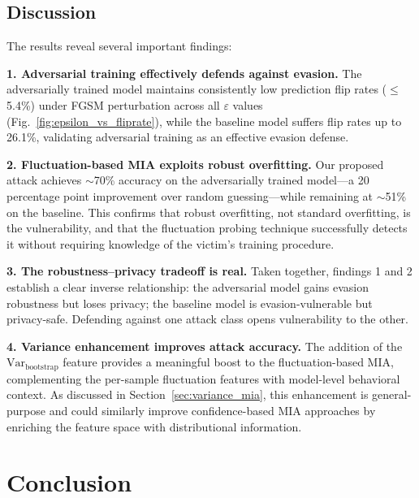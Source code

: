 \documentclass[conference]{IEEEtran}
\begin{document}
\subsection{Discussion}

The results reveal several important findings:

\textbf{1. Adversarial training effectively defends against evasion.} The adversarially trained model maintains consistently low prediction flip rates ($\leq$5.4\%) under FGSM perturbation across all $\varepsilon$ values (Fig.~\ref{fig:epsilon_vs_fliprate}), while the baseline model suffers flip rates up to 26.1\%, validating adversarial training as an effective evasion defense.

\textbf{2. Fluctuation-based MIA exploits robust overfitting.} Our proposed attack achieves $\sim$70\% accuracy on the adversarially trained model---a 20 percentage point improvement over random guessing---while remaining at $\sim$51\% on the baseline. This confirms that robust overfitting, not standard overfitting, is the vulnerability, and that the fluctuation probing technique successfully detects it without requiring knowledge of the victim's training procedure.

\textbf{3. The robustness--privacy tradeoff is real.} Taken together, findings 1 and 2 establish a clear inverse relationship: the adversarial model gains evasion robustness but loses privacy; the baseline model is evasion-vulnerable but privacy-safe. Defending against one attack class opens vulnerability to the other.

\textbf{4. Variance enhancement improves attack accuracy.} The addition of the $\text{Var}_{\text{bootstrap}}$ feature provides a meaningful boost to the fluctuation-based MIA, complementing the per-sample fluctuation features with model-level behavioral context. As discussed in Section~\ref{sec:variance_mia}, this enhancement is general-purpose and could similarly improve confidence-based MIA approaches by enriching the feature space with distributional information.




\section{Conclusion}
\label{sec:conclusion}
\end{document}

